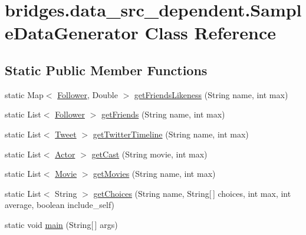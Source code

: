\hypertarget{classbridges_1_1data__src__dependent_1_1_sample_data_generator}{}\section{bridges.\+data\+\_\+src\+\_\+dependent.\+Sample\+Data\+Generator Class Reference}
\label{classbridges_1_1data__src__dependent_1_1_sample_data_generator}
\subsection*{Static Public Member Functions}
\begin{DoxyCompactItemize}
\item 
static Map$<$ \mbox{\hyperlink{classbridges_1_1data__src__dependent_1_1_follower}{Follower}}, Double $>$ \mbox{\hyperlink{classbridges_1_1data__src__dependent_1_1_sample_data_generator_a940034ad3107806e65741dca0a029d1b}{get\+Friends\+Likeness}} (String name, int max)
\item 
static List$<$ \mbox{\hyperlink{classbridges_1_1data__src__dependent_1_1_follower}{Follower}} $>$ \mbox{\hyperlink{classbridges_1_1data__src__dependent_1_1_sample_data_generator_a60ed9c5edd05d614f6ff5364edd5187e}{get\+Friends}} (String name, int max)
\item 
static List$<$ \mbox{\hyperlink{classbridges_1_1data__src__dependent_1_1_tweet}{Tweet}} $>$ \mbox{\hyperlink{classbridges_1_1data__src__dependent_1_1_sample_data_generator_a9e52e53de820233e76553f5db1a01c80}{get\+Twitter\+Timeline}} (String name, int max)
\item 
static List$<$ \mbox{\hyperlink{classbridges_1_1data__src__dependent_1_1_actor}{Actor}} $>$ \mbox{\hyperlink{classbridges_1_1data__src__dependent_1_1_sample_data_generator_a2e5c2ea6214a140a50b375f4e859ed0d}{get\+Cast}} (String movie, int max)
\item 
static List$<$ \mbox{\hyperlink{classbridges_1_1data__src__dependent_1_1_movie}{Movie}} $>$ \mbox{\hyperlink{classbridges_1_1data__src__dependent_1_1_sample_data_generator_a5b654cc82316f320ad9b001aa7cdcfb9}{get\+Movies}} (String name, int max)
\item 
static List$<$ String $>$ \mbox{\hyperlink{classbridges_1_1data__src__dependent_1_1_sample_data_generator_a5b93af083c764f1046ebb6d1b9ae8d6f}{get\+Choices}} (String name, String\mbox{[}$\,$\mbox{]} choices, int max, int average, boolean include\+\_\+self)
\item 
static void \mbox{\hyperlink{classbridges_1_1data__src__dependent_1_1_sample_data_generator_ae37dc24f262b58481822cf228bd97054}{main}} (String\mbox{[}$\,$\mbox{]} args)
\end{DoxyCompactItemize}
